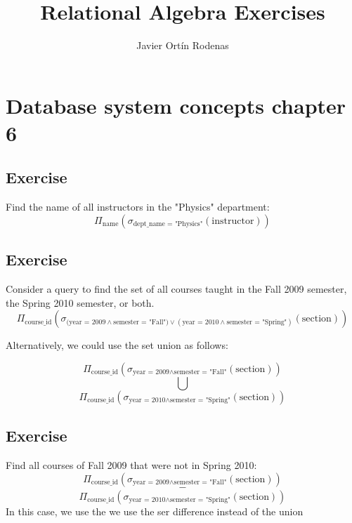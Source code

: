 \documentclass{article}
\title{Relational Algebra Exercises}
\author{Javier Ortín Rodenas}
\begin{document}
\maketitle
\noindent
\newpage
\section{Database system concepts chapter 6}
\vspace{2ex}
\subsection{Exercise}
Find the name of all instructors in the "Physics" department:
$$\Pi_{\text{name}}\left(\sigma_{\text{dept\_name = "Physics"}}(\text{instructor})\right)$$

\subsection{Exercise}
Consider a query to find the set of all courses taught in the Fall 2009 semester, the
Spring 2010 semester, or both.
$$\Pi_{\text{course\_id}}\left(
    \sigma_{\text{
            (year = 2009} \wedge \text{semester = "Fall")}
        \vee (
            \text{year = 2010} \wedge \text{semester = "Spring"}
        )}(\text{section})\right)$$

\vspace{2ex}
\noindent
Alternatively, we could use the set union as follows:

$$\Pi_{\text{course\_id}}\left(
            \sigma_{\text{year = 2009} \wedge
            \text{semester = "Fall"}}(\text{section})\right) $$
            $$\bigcup $$
            $$\Pi_{\text{course\_id}}\left(
                \sigma_{\text{year = 2010} \wedge \text{semester = "Spring"}}(\text{section})\right)$$

\vspace{2ex}
\subsection{Exercise}
Find all courses of Fall 2009 that were not in Spring 2010:
$$\Pi_{\text{course\_id}}\left(
            \sigma_{\text{year = 2009} \wedge
            \text{semester = "Fall"}}(\text{section})\right) $$
            $$\boldsymbol{-} $$
            $$\Pi_{\text{course\_id}}\left(
                \sigma_{\text{year = 2010} \wedge \text{semester = "Spring"}}(\text{section})\right)$$
\vspace{2mm}
\noindent In this case, we use the we use the ser difference instead of the union
\end{document}
